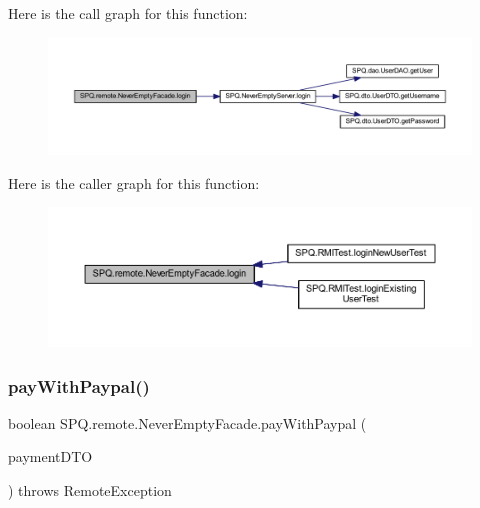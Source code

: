 Here is the call graph for this function\+:
\nopagebreak
\begin{figure}[H]
\begin{center}
\leavevmode
\includegraphics[width=350pt]{class_s_p_q_1_1remote_1_1_never_empty_facade_a3fdd96efa1256ea520a497b8a20578e8_cgraph}
\end{center}
\end{figure}
Here is the caller graph for this function\+:
\nopagebreak
\begin{figure}[H]
\begin{center}
\leavevmode
\includegraphics[width=350pt]{class_s_p_q_1_1remote_1_1_never_empty_facade_a3fdd96efa1256ea520a497b8a20578e8_icgraph}
\end{center}
\end{figure}
\mbox{\label{class_s_p_q_1_1remote_1_1_never_empty_facade_a9942c7930b5144f0677dc0fdcde25cc3}} 
\subsubsection{\texorpdfstring{pay\+With\+Paypal()}{payWithPaypal()}}
{\footnotesize\ttfamily boolean S\+P\+Q.\+remote.\+Never\+Empty\+Facade.\+pay\+With\+Paypal (\begin{DoxyParamCaption}\item[{\mbox{\hyperlink{class_s_p_q_1_1dto_1_1_payment_d_t_o}{Payment\+D\+TO}}}]{payment\+D\+TO }\end{DoxyParamCaption}) throws Remote\+Exception}



